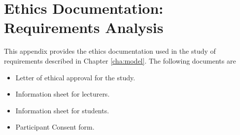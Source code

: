 \chapter{Ethics Documentation: Requirements Analysis}

This appendix provides the ethics documentation used in the study of \LLLs
requirements described in Chapter \ref{cha:model}. The following documents are 

\begin{itemize}
  \item Letter of ethical approval for the study.
  \item Information sheet for lecturers.
  \item Information sheet for students.
  \item Participant Consent form.
\end{itemize}











